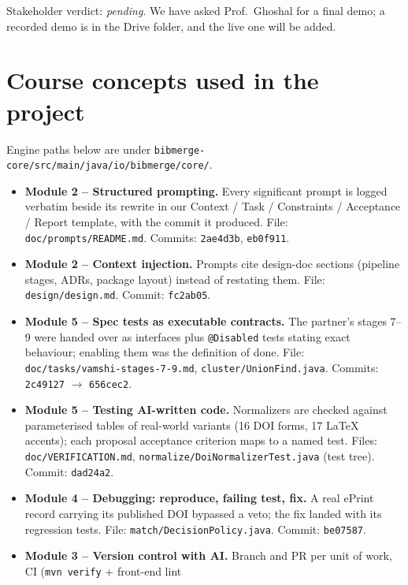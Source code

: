 \documentclass[11pt,a4paper]{article}
\begin{document}
Stakeholder verdict: \emph{pending}.  We have asked Prof.\ Ghoshal for a final
demo; a recorded demo is in the Drive folder, and the live one will be added.

\section{Course concepts used in the project}

Engine paths below are under \texttt{bibmerge-core/src/main/java/io/bibmerge/core/}.

\begin{itemize}[leftmargin=*,nosep]
  \item \textbf{Module 2 -- Structured prompting.}  Every significant
        prompt is logged verbatim beside its rewrite in our
        Context / Task / Constraints / Acceptance / Report template, with the
        commit it produced.  File: \texttt{doc/prompts/README.md}.
        Commits: \texttt{2ae4d3b}, \texttt{eb0f911}.
  \item \textbf{Module 2 -- Context injection.}  Prompts
        cite design-doc sections (pipeline stages, ADRs, package layout) instead
        of restating them.  File: \texttt{design/design.md}.  Commit: \texttt{fc2ab05}.
  \item \textbf{Module 5 -- Spec tests as executable contracts.}  The
        partner's stages 7--9 were handed over as interfaces plus
        \texttt{@Disabled} tests stating exact behaviour; enabling them was the
        definition of done.  File: \texttt{doc/tasks/vamshi-stages-7-9.md},
        \texttt{cluster/UnionFind.java}.  Commits: \texttt{2c49127} $\to$ \texttt{656cec2}.
  \item \textbf{Module 5 -- Testing AI-written code.}  Normalizers are
        checked against parameterised tables of real-world variants (16 DOI
        forms, 17 LaTeX accents); each proposal acceptance criterion maps to a
        named test.  Files: \texttt{doc/VERIFICATION.md},
        \texttt{normalize/DoiNormalizerTest.java} (test tree).  Commit: \texttt{dad24a2}.
  \item \textbf{Module 4 -- Debugging: reproduce, failing test, fix.}
        A real ePrint record carrying its published DOI bypassed a veto; the
        fix landed with its regression tests.  File: \texttt{match/DecisionPolicy.java}.
        Commit: \texttt{be07587}.
  \item \textbf{Module 3 -- Version control with AI.}
        Branch and PR per unit of work, CI (\texttt{mvn verify} + front-end lint

\end{itemize}
\end{document}
